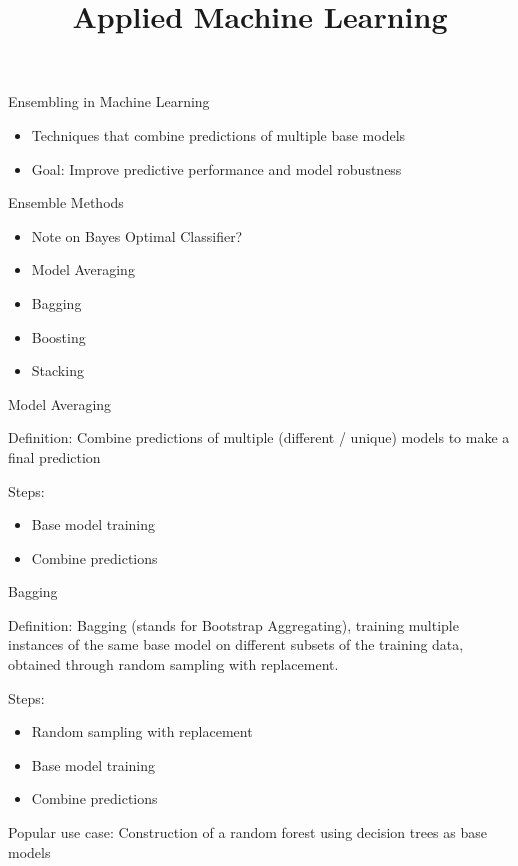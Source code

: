 \documentclass[11pt,compress,t,notes=noshow, aspectratio=169, xcolor=table]{beamer}
\title{Applied Machine Learning}
\date{}
\begin{document}


\begin{vbframe}{Ensembling in Machine Learning}
\begin{itemize}
\item Techniques that combine predictions of multiple base models
\item Goal: Improve predictive performance and model robustness
\end{itemize}
\end{vbframe}


\begin{vbframe}{Ensemble Methods}
\begin{itemize}
\item Note on Bayes Optimal Classifier? 
\item Model Averaging
\item Bagging
\item Boosting
\item Stacking
\end{itemize}
\end{vbframe}


\begin{vbframe}{Model Averaging}

Definition: Combine predictions of multiple (different / unique) models to make a final prediction

Steps:

\begin{itemize}
\item Base model training
\item Combine predictions
\end{itemize}

\end{vbframe}


\begin{vbframe}{Bagging}

  Definition: Bagging (stands for Bootstrap Aggregating), training multiple instances of the same base model on different subsets of the training data, obtained through random sampling with replacement.

Steps:

\begin{itemize}
\item Random sampling with replacement
\item Base model training
\item Combine predictions
\end{itemize}

Popular use case: Construction of a random forest using decision trees as base models

\end{vbframe}
\end{document}
